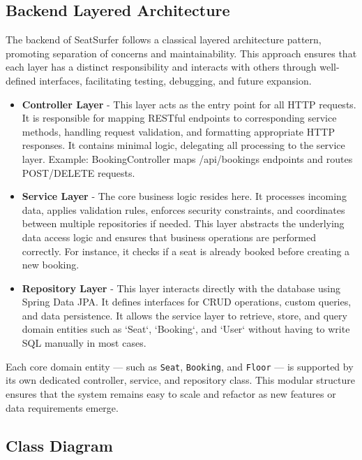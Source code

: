 \documentclass[12pt,a4paper]{report} %
\begin{document}
\subsection{Backend Layered Architecture}

The backend of SeatSurfer follows a classical layered architecture pattern, promoting separation of concerns and maintainability. This approach ensures that each layer has a distinct responsibility and interacts with others through well-defined interfaces, facilitating testing, debugging, and future expansion.

\begin{itemize}
\item \textbf{Controller Layer} - This layer acts as the entry point for all HTTP requests. It is responsible for mapping RESTful endpoints to corresponding service methods, handling request validation, and formatting appropriate HTTP responses. It contains minimal logic, delegating all processing to the service layer. Example: BookingController maps /api/bookings endpoints and routes POST/DELETE requests.
\item \textbf{Service Layer} - The core business logic resides here. It processes incoming data, applies validation rules, enforces security constraints, and coordinates between multiple repositories if needed. This layer abstracts the underlying data access logic and ensures that business operations are performed correctly. For instance, it checks if a seat is already booked before creating a new booking.
\item \textbf{Repository Layer} - This layer interacts directly with the database using Spring Data JPA. It defines interfaces for CRUD operations, custom queries, and data persistence. It allows the service layer to retrieve, store, and query domain entities such as `Seat`, `Booking`, and `User` without having to write SQL manually in most cases.
\end{itemize}

Each core domain entity — such as \texttt{Seat}, \texttt{Booking}, and \texttt{Floor} — is supported by its own dedicated controller, service, and repository class. This modular structure ensures that the system remains easy to scale and refactor as new features or data requirements emerge.

\subsection{Class Diagram}
\end{document}
